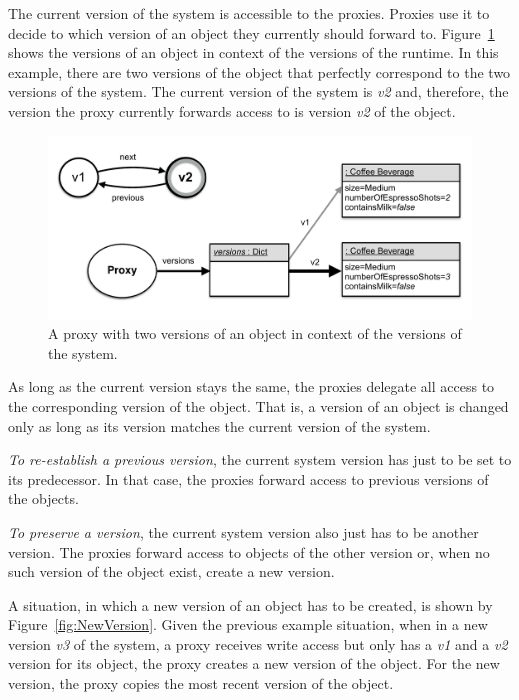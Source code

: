 The current version of the system is accessible to the proxies.
Proxies use it to decide to which version of an object they currently should forward to.
Figure~\ref{fig:ProxyUseSystemVersion} shows the versions of an object in context of the versions of the runtime.
In this example, there are two versions of the object that perfectly correspond to the two versions of the system.
The current version of the system is \emph{v2} and, therefore, the version the proxy currently forwards access to is version \emph{v2} of the object.

\begin{figure}[h]
    \centering
    \includegraphics[width=\textwidth]{figures/4_approach/9_proxyUsesSystemVersion.pdf}
    \caption{A proxy with two versions of an object in context of the versions of the system.}
    \label{fig:ProxyUseSystemVersion}
\end{figure}

As long as the current version stays the same, the proxies delegate all access to the corresponding version of the object.
That is, a version of an object is changed only as long as its version matches the current version of the system.

\emph{To re-establish a previous version}, the current system version has just to be set to its predecessor.
In that case, the proxies forward access to previous versions of the objects.

\emph{To preserve a version}, the current system version also just has to be another version.
The proxies forward access to objects of the other version or, when no such version of the object exist, create a new version.

A situation, in which a new version of an object has to be created, is shown by Figure~\ref{fig:NewVersion}.
Given the previous example situation, when in a new version \emph{v3} of the system, a proxy receives write access but only has a \emph{v1} and a \emph{v2} version for its object, the proxy creates a new version of the object.
For the new version, the proxy copies the most recent version of the object.

